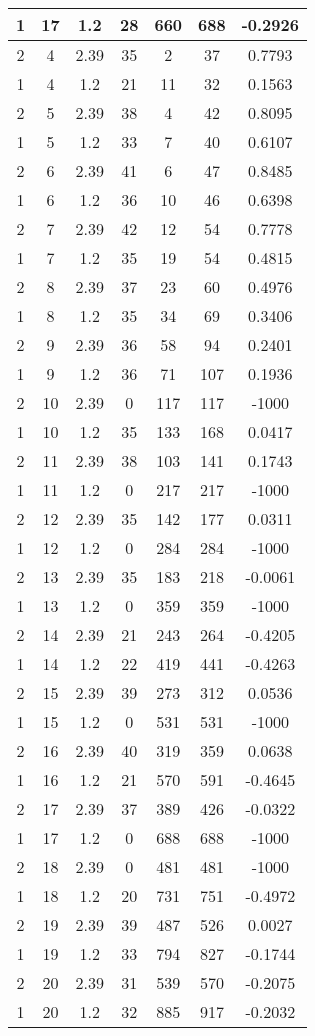 \documentclass[letterpaper, 12pt]{article}
\begin{document}
\begin{longtable}{|c|c|c|c|c|c|c|}
\hline
1 & 17 & 1.2 & 28 & 660 & 688 & -0.2926 \\
\hline
2 & 4 & 2.39 & 35 & 2 & 37 & 0.7793 \\
\hline
1 & 4 & 1.2 & 21 & 11 & 32 & 0.1563 \\
\hline
2 & 5 & 2.39 & 38 & 4 & 42 & 0.8095 \\
\hline
1 & 5 & 1.2 & 33 & 7 & 40 & 0.6107 \\
\hline
2 & 6 & 2.39 & 41 & 6 & 47 & 0.8485 \\
\hline
1 & 6 & 1.2 & 36 & 10 & 46 & 0.6398 \\
\hline
2 & 7 & 2.39 & 42 & 12 & 54 & 0.7778 \\
\hline
1 & 7 & 1.2 & 35 & 19 & 54 & 0.4815 \\
\hline
2 & 8 & 2.39 & 37 & 23 & 60 & 0.4976 \\
\hline
1 & 8 & 1.2 & 35 & 34 & 69 & 0.3406 \\
\hline
2 & 9 & 2.39 & 36 & 58 & 94 & 0.2401 \\
\hline
1 & 9 & 1.2 & 36 & 71 & 107 & 0.1936 \\
\hline
2 & 10 & 2.39 & 0 & 117 & 117 & -1000 \\
\hline
1 & 10 & 1.2 & 35 & 133 & 168 & 0.0417 \\
\hline
2 & 11 & 2.39 & 38 & 103 & 141 & 0.1743 \\
\hline
1 & 11 & 1.2 & 0 & 217 & 217 & -1000 \\
\hline
2 & 12 & 2.39 & 35 & 142 & 177 & 0.0311 \\
\hline
1 & 12 & 1.2 & 0 & 284 & 284 & -1000 \\
\hline
2 & 13 & 2.39 & 35 & 183 & 218 & -0.0061 \\
\hline
1 & 13 & 1.2 & 0 & 359 & 359 & -1000 \\
\hline
2 & 14 & 2.39 & 21 & 243 & 264 & -0.4205 \\
\hline
1 & 14 & 1.2 & 22 & 419 & 441 & -0.4263 \\
\hline
2 & 15 & 2.39 & 39 & 273 & 312 & 0.0536 \\
\hline
1 & 15 & 1.2 & 0 & 531 & 531 & -1000 \\
\hline
2 & 16 & 2.39 & 40 & 319 & 359 & 0.0638 \\
\hline
1 & 16 & 1.2 & 21 & 570 & 591 & -0.4645 \\
\hline
2 & 17 & 2.39 & 37 & 389 & 426 & -0.0322 \\
\hline
1 & 17 & 1.2 & 0 & 688 & 688 & -1000 \\
\hline
2 & 18 & 2.39 & 0 & 481 & 481 & -1000 \\
\hline
1 & 18 & 1.2 & 20 & 731 & 751 & -0.4972 \\
\hline
2 & 19 & 2.39 & 39 & 487 & 526 & 0.0027 \\
\hline
1 & 19 & 1.2 & 33 & 794 & 827 & -0.1744 \\
\hline
2 & 20 & 2.39 & 31 & 539 & 570 & -0.2075 \\
\hline
1 & 20 & 1.2 & 32 & 885 & 917 & -0.2032 \\
\hline
\end{longtable}
\end{document}
